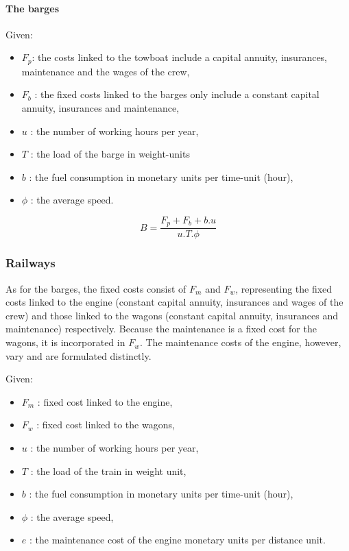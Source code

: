 \paragraph{The barges}

Given:

\begin{itemize}
\item $F_p$: the costs linked to the towboat include a capital annuity, insurances,
maintenance and the wages of the crew,
\item $F_b$ : the fixed costs linked to the barges only include a constant capital annuity,
insurances and maintenance,
\item $u$ : the number of working hours per year,
\item $T$ : the load of the barge in weight-units
\item $b$ : the fuel consumption in monetary units per time-unit (hour),
\item $\phi$ : the average speed.
\end{itemize}

$$B = \frac{F_p + F_b + b.u}{u.T.\phi}$$

\subsubsection{Railways}

As for the barges, the fixed costs consist of $F_m$ and $F_w$, representing the
fixed costs linked to the engine (constant capital annuity, insurances and wages
of the crew) and those linked to the wagons (constant capital annuity,
insurances and maintenance) respectively.  Because the maintenance is a fixed
cost for the wagons, it is incorporated in $F_w$. The maintenance costs of the
engine, however, vary and are formulated distinctly.

Given:

\begin{itemize}
\item $F_m$ : fixed cost linked to the engine,
\item $F_w$ : fixed cost linked to the wagons,
\item $u$ : the number of working hours per year,
\item $T$ : the load of the train in weight unit,
\item $b$ : the fuel consumption in monetary units per time-unit (hour),
\item $\phi$ : the average speed,
\item $e$ : the maintenance cost of the engine monetary units per distance unit.
\end{itemize}


